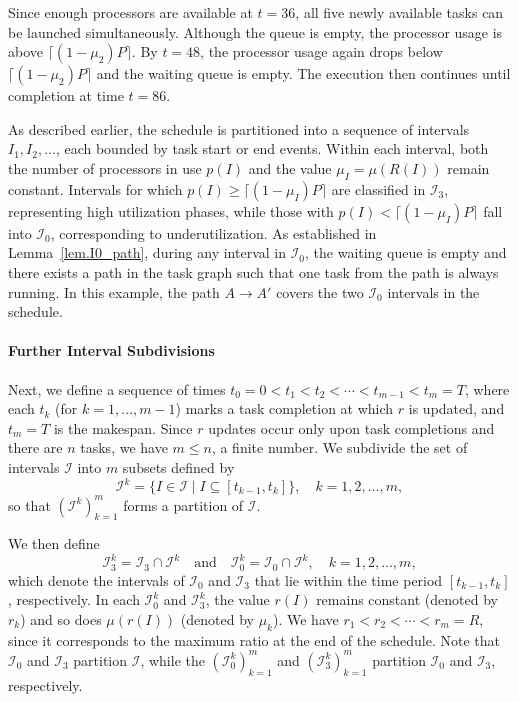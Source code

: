 \documentclass{article}
\newcommand\ratio{R\xspace}
\newcommand\rratio{r\xspace}
\begin{document}
Since enough processors are available at $t=36$, all five newly available tasks can be launched simultaneously. Although the queue is empty, the processor usage is above $\lceil (1-\mu_2) P \rceil$. By $t=48$, the processor usage again drops below $\lceil (1-\mu_2) P \rceil$ and the waiting queue is empty. The execution then continues until completion at time $t=86$.

As described earlier, the schedule is partitioned into a sequence of intervals $I_1, I_2, \dots$, each bounded by task start or end events. Within each interval, both the number of processors in use $p(I)$ and the value $\mu_I = \mu(\ratio(I))$ remain constant. Intervals for which $p(I) \geq \lceil (1 - \mu_I) P \rceil$ are classified in $\mathcal{I}_3$, representing high utilization phases, while those with $p(I) < \lceil (1 - \mu_I) P \rceil$ fall into $\mathcal{I}_0$, corresponding to underutilization. As established in Lemma~\ref{lem.I0_path}, during any interval in $\mathcal{I}_0$, the waiting queue is empty and there exists a path in the task graph such that one task from the path is always running. In this example, the path $A \rightarrow A'$ covers the two $\mathcal{I}_0$ intervals in the schedule.



\paragraph{Further Interval Subdivisions }Next, we define a sequence of times \(t_0 = 0 < t_1 < t_2 < \cdots < t_{m-1} < t_m = T\), where each \(t_k\) (for \(k = 1, \dots, m-1\)) marks a task completion at which \(\rratio\) is updated, and \(t_m = T\) is the makespan. Since \(\rratio\) updates occur only upon task completions and there are \(n\) tasks, we have \(m \leq n\), a finite number. We subdivide the set of intervals \(\mathcal{I}\) into \(m\) subsets defined by
\[
\mathcal{I}^k = \{ I \in \mathcal{I} \mid I \subseteq [t_{k-1}, t_k] \}, \quad k = 1, 2, \dots, m,
\]
so that \((\mathcal{I}^k)_{k=1}^m\) forms a partition of \(\mathcal{I}\).

We then define 
\[
\mathcal{I}_3^k = \mathcal{I}_3 \cap \mathcal{I}^k \quad \text{and} \quad \mathcal{I}_0^k = \mathcal{I}_0 \cap \mathcal{I}^k,\quad k = 1,2,\dots,m,
\]
which denote the intervals of \(\mathcal{I}_0\) and \(\mathcal{I}_3\) that lie within the time period \([t_{k-1}, t_k]\), respectively. In each \(\mathcal{I}_0^k\) and \(\mathcal{I}_3^k\), the value \(\rratio(I)\) remains constant (denoted by \(\rratio_k\)) and so does \(\mu(\rratio(I))\) (denoted by \(\mu_k\)). We have $\rratio_1<\rratio_2<\cdots<\rratio_m=\ratio$, since it corresponds to the maximum ratio at the end of the schedule. Note that \(\mathcal{I}_0\) and \(\mathcal{I}_3\) partition \(\mathcal{I}\), while the \((\mathcal{I}_0^k)_{k=1}^m\) and \((\mathcal{I}_3^k)_{k=1}^m\) partition \(\mathcal{I}_0\) and \(\mathcal{I}_3\), respectively.
\end{document}
